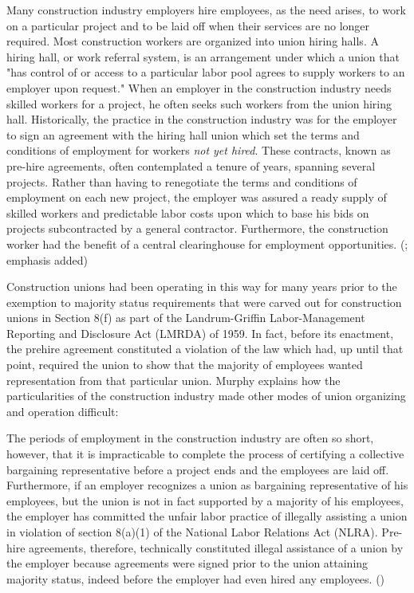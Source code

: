 \documentclass[12pt]{article}
\renewenvironment{quote}
  {\list{}{\leftmargin=\parindent\rightmargin=0pt}%
   \item\relax}
  {\endlist}
\begin{document}
\begin{quote}
Many construction industry employers hire employees, as the need arises, to work on a particular project and to be laid off when their services are no longer required. Most construction workers are organized into union hiring halls. A hiring hall, or work referral system, is an arrangement under which a union that "has control of or access to a particular labor pool agrees to supply workers to an employer upon request." When an employer in the construction industry needs skilled workers for a project, he often seeks such workers from the union hiring hall. Historically, the practice in the construction industry was for the employer to sign an agreement with the hiring hall union which set the terms and conditions of employment for workers \textit{not yet hired}. These contracts, known as pre-hire agreements, often contemplated a tenure of years, spanning several projects. Rather than having to renegotiate the terms and conditions of employment on each new project, the employer was assured a ready supply of skilled workers and predictable labor costs upon which to base his bids on projects subcontracted by a general contractor. Furthermore, the construction worker had the benefit of a central clearinghouse for employment opportunities. (\cite[1014–15]{murphyPreHireAgreementsSection1982}; emphasis added)
\end{quote}

Construction unions had been operating in this way for many years prior to the exemption to majority status requirements that were carved out for construction unions in Section 8(f) as part of the Landrum-Griffin Labor-Management Reporting and Disclosure Act (LMRDA) of 1959. In fact, before its enactment, the prehire agreement constituted a violation of the law which had, up until that point, required the union to show that the majority of employees wanted representation from that particular union. Murphy explains how the particularities of the construction industry made other modes of union organizing and operation difficult:

\begin{quote}
The periods of employment in the construction industry are often so short, however, that it is impracticable to complete the process of certifying a collective bargaining representative before a project ends and the employees are laid off. Furthermore, if an employer recognizes a union as bargaining representative of his employees, but the union is not in fact supported by a majority of his employees, the employer has committed the unfair labor practice of illegally assisting a union in violation of section 8(a)(1) of the National Labor Relations Act (NLRA). Pre-hire agreements, therefore, technically constituted illegal assistance of a union by the employer because agreements were signed prior to the union attaining majority status, indeed before the employer had even hired any employees. (\citeyear[1016–17]{murphyPreHireAgreementsSection1982})
\end{quote}
\end{document}
